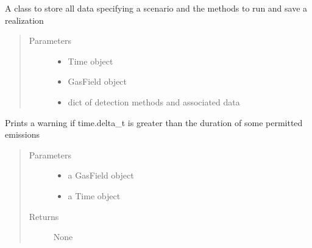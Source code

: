 \documentclass[letterpaper,10pt,english]{sphinxmanual}
\begin{document}
\begin{fulllineitems}
\label{\detokenize{index:feast.EmissionSimModules.simulation_classes.Scenario}}
A class to store all data specifying a scenario and the methods to run and save a realization
\begin{quote}\begin{description}
\item[{Parameters}] \leavevmode\begin{itemize}
\item {} 
 \textendash{} Time object

\item {} 
 \textendash{} GasField object

\item {} 
 \textendash{} dict of detection methods and associated data

\end{itemize}

\end{description}\end{quote}

\begin{fulllineitems}
\label{\detokenize{index:feast.EmissionSimModules.simulation_classes.Scenario.check_timestep}}
Prints a warning if time.delta\_t is greater than the duration of some permitted emissions
\begin{quote}\begin{description}
\item[{Parameters}] \leavevmode\begin{itemize}
\item {} 
 \textendash{} a GasField object

\item {} 
 \textendash{} a Time object

\end{itemize}

\item[{Returns}] \leavevmode
None


\end{description}
\end{quote}
\end{fulllineitems}
\end{fulllineitems}
\end{document}
